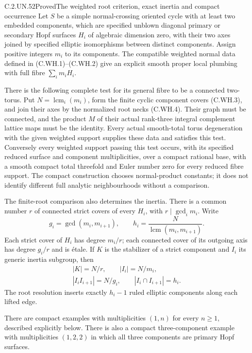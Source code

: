 \begin{statement}{C.2.UN.52}{Proved}{The weighted root criterion, exact inertia and compact occurrence}
Let $S$ be a simple normal-crossing oriented cycle
with at least two embedded components, which are specified unblown
diagonal primary or secondary Hopf surfaces $H_i$
of algebraic dimension zero, with their two axes
joined by specified elliptic isomorphisms between distinct components.
Assign positive integers $m_i$ to its components.
The compatible weighted normal data defined in
(C.WH.1)--(C.WH.2) give an explicit smooth proper
local plumbing with full fibre $\sum_i m_iH_i$.

There is the following complete test for its
general fibre to be a connected two-torus.
Put $N=\operatorname{lcm}_i(m_i)$, form the finite
cyclic component covers (C.WH.3), and join their
axes by the normalized root necks (C.WH.4).
Their graph must be connected, and the product
$M$ of their actual rank-three integral complement
lattice maps must be the identity. Every actual
smooth-total torus degeneration with the given
weighted support supplies these data and satisfies
this test. Conversely every weighted support
passing this test occurs, with its specified
reduced surface and component multiplicities,
over a compact rational base, with a smooth
compact total threefold and Euler number zero
for every reduced fibre support. The compact
construction chooses normal-product constants;
it does not identify different full analytic
neighbourhoods without a comparison.

The finite-root comparison also determines the
inertia. There is a common number $r$ of connected
strict covers of every $H_i$, with
$r\mid\gcd_i m_i$. Write
\[
 g_i=\gcd(m_i,m_{i+1}),\qquad
 h_i=\frac{N}{\operatorname{lcm}(m_i,m_{i+1})}.
\]
Each strict cover of $H_i$ has degree $m_i/r$;
each connected cover of its outgoing axis has
degree $g_i/r$ and is \'{e}tale. If $K$ is the
stabilizer of a strict component and $I_i$
its generic inertia subgroup, then
\[
 \begin{gathered}
 |K|=N/r,\qquad |I_i|=N/m_i,\\
 |I_iI_{i+1}|=N/g_i,\qquad
 |I_i\cap I_{i+1}|=h_i.
 \end{gathered}
\tag{C.WH.0}
\]
The root resolution inserts exactly $h_i-1$
ruled elliptic components along each lifted edge.

There are compact examples with multiplicities
$(1,n)$ for every $n\ge1$, described explicitly
below. There is also a compact three-component
example with multiplicities $(1,2,2)$ in which
all three components are primary Hopf surfaces.
\end{statement}

